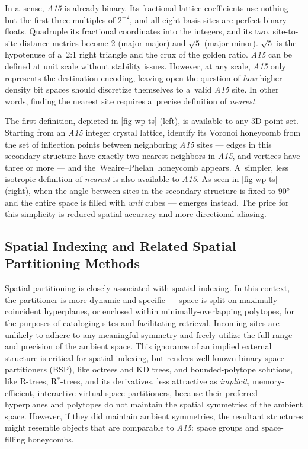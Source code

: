\documentclass[10pt]{article}
\def\AAAB{\textit{A15}}
\def\tWPh{the~Weaire--Phelan~honeycomb}
\begin{document}
In a~sense, \AAAB{} is already binary. Its fractional lattice coefficients use nothing but the first three multiples of $2^{-2}$,
and all eight basis sites are perfect binary floats. Quadruple its fractional coordinates into the integers, and its two,
site-to-site distance metrics become $2$ (major-major) and $\sqrt{5}$ (major-minor). $\sqrt{5}$ is the hypotenuse of a~2:1 right
triangle and the crux of the golden ratio. \AAAB{} can be defined at unit scale without stability issues. However, at any scale,
\AAAB{} only represents the destination encoding, leaving open the question of \emph{how} higher-density bit spaces should
discretize themselves to a~valid \AAAB{} site. In other words, finding the nearest site requires a~precise definition of
\emph{nearest}.

The first definition, depicted in \autoref{fig-wp-ts} (left), is available to any 3D point set. Starting from an \AAAB{} integer
crystal lattice, identify its Voronoi honeycomb from the set of inflection points between neighboring \AAAB{} sites --- edges in
this secondary structure have exactly two nearest neighbors in \AAAB{}, and vertices have three or more --- and \tWPh{} appears.
A~simpler, less isotropic definition of \emph{nearest} is also available to \AAAB{}. As seen in \autoref{fig-wp-ts} (right), when
the angle between sites in the secondary structure is fixed to 90° and the entire space is filled with
\emph{unit} cubes --- \tTSp{} emerges instead. The price for this simplicity is reduced spatial accuracy and more directional
aliasing.

\subsection{Spatial Indexing and Related Spatial Partitioning Methods}\label{spatial-indexing-and-related-spatial-partitioning-methods}

Spatial partitioning is closely associated with spatial indexing. In this context, the partitioner is more dynamic and
specific --- space is split on maximally-coincident hyperplanes, or enclosed within minimally-overlapping polytopes, for the
purposes of cataloging sites and facilitating retrieval. Incoming sites are unlikely to adhere to any meaningful symmetry and
freely utilize the full range and precision of the ambient space. This ignorance of an implied external structure is critical for
spatial indexing, but renders well-known binary space partitioners (BSP), like octrees and KD trees, and bounded-polytope
solutions, like R-trees, R$^*$-trees, and its derivatives, less attractive as \emph{implicit}, memory-efficient, interactive
virtual space partitioners, because their preferred hyperplanes and polytopes do not maintain the spatial symmetries of the
ambient space. However, if they did maintain ambient symmetries, the resultant structures might resemble objects that are
comparable to \AAAB{}: space groups and space-filling honeycombs.
\end{document}
